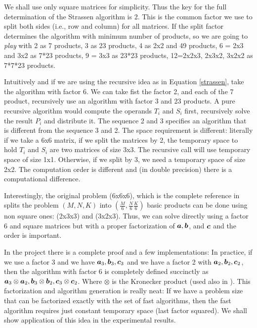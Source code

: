 \documentclass[acmsmall]{acmart}
\begin{document}
We shall use only square matrices for simplicity. Thus the key for the
full determination of the Strassen algorithm is 2. This is the common
factor we use to split both sides (i.e., row and column) for all
matrices. If the split factor determines the algorithm with minimum
number of products, so we are going to {\em play} with 2 as 7
products, 3 as 23 products, 4 as 2x2 and 49 products, 6 = 2x3 and 3x2
as 7*23 products, 9 = 3x3 as 23*23 products, 12=2x2x3, 2x3x2, 3x2x2 as
7*7*23 products.

Intuitively and if we are using the recursive idea as in Equation
\ref{strassen}, take the algorithm with factor 6. We can take fist the
factor 2, and each of the 7 product, recursively use an algorithm with
factor 3 and 23 products. A pure recursive algorithm would compute the
operands $T_i$ and $S_i$ first, recursively solve the result $P_i$ and
distribute it. The sequence 2 and 3 specifies an algorithm that is
different from the sequence 3 and 2.  The space requirement is
different: literally if we take a 6x6 matrix, if we split the matrices
by 2, the temporary space to hold $T_i$ and $S_i$ are two matrices of
size 3x3. The recursive call will use temporary space of size
1x1. Otherwise, if we split by 3, we need a temporary space of size
2x2. The computation order is different and (in double precision)
there is a computational difference.

Interestingly, the original problem (6x6x6), which is the complete
reference in \cite{PMID:36198780} splits the problem $(M,N,K)$ into
$(\frac{M}{6},\frac{N}{6}\frac{K}{6})$ basic products can be done
using non square ones: (2x3x3) and (3x2x3). Thus, we can solve
directly using a factor 6 and square matrices but with a proper
factorization of ${\boldsymbol a},{\boldsymbol b}$, and ${\boldsymbol c}$ and the order is
important.

In the project there is a complete proof and a few implementations: In
practice, if we use a factor 3 and we have ${\boldsymbol a}_3, {\boldsymbol b}_3,
{\boldsymbol c}_3$ and we have a factor 2 with ${\boldsymbol a}_2, {\boldsymbol b}_2, {\boldsymbol c}_2$,
then the algorithm with factor 6 is completely defined succinctly as
${\boldsymbol a}_3 \otimes {\boldsymbol a}_2, {\boldsymbol b}_3 \otimes {\boldsymbol b}_2, {\boldsymbol c}_3
\otimes {\boldsymbol c}_2$. Where $\otimes$ is the Kronecker product (used also
in \cite{PMID:36198780}). This factorization and algorithm generation
is really neat: If we have a problem size that can be factorized
exactly with the set of fast algorithms, then the fast algorithm
requires just constant temporary space (last factor squared). We shall
show application of this idea in the experimental results.
\end{document}
